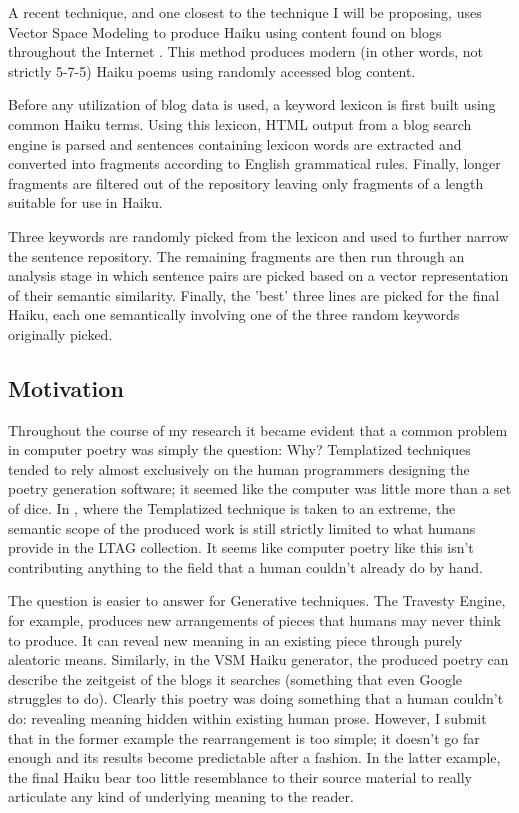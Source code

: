 \documentclass[10pt]{article}
\begin{document}
A recent technique, and one closest to the technique I will be proposing, uses
Vector Space Modeling to produce Haiku using content found on blogs throughout
the Internet \cite{Wong08}. This method produces modern (in other words, not
strictly 5-7-5) Haiku poems using randomly accessed blog content. 

Before any utilization of blog data is used, a keyword lexicon is first built
using common Haiku terms. Using this lexicon, HTML output from a blog search
engine is parsed and sentences containing lexicon words are extracted and
converted into fragments according to English grammatical rules. Finally, longer
fragments are filtered out of the repository leaving only fragments of a length
suitable for use in Haiku.

Three keywords are randomly picked from the lexicon and used to further narrow
the sentence repository. The remaining fragments are then run through an
analysis stage in which sentence pairs are picked based on a vector
representation of their semantic similarity. Finally, the 'best' three lines
are picked for the final Haiku, each one semantically involving one of the
three random keywords originally picked.

\subsection{Motivation}
Throughout the course of my research it became evident that a common problem in
computer poetry was simply the question: Why? Templatized techniques tended to
rely almost exclusively on the human programmers designing the poetry
generation software; it seemed like the computer was little more than a set of
dice. In \cite{Manurung03}, where the Templatized technique is taken to an
extreme, the semantic scope of the produced work is still strictly limited to
what humans provide in the LTAG collection. It seems like computer poetry like
this isn't contributing anything to the field that a human couldn't already do
by hand.

The question is easier to answer for Generative techniques. The Travesty
Engine, for example, produces new arrangements of pieces that humans may never
think to produce. It can reveal new meaning in an existing piece through purely
aleatoric means. Similarly, in the VSM Haiku generator, the produced poetry can
describe the zeitgeist of the blogs it searches (something that even Google
struggles to do). Clearly this poetry was doing something that a human couldn't
do: revealing meaning hidden within existing human prose. However, I submit
that in the former example the rearrangement is too simple; it doesn't go far
enough and its results become predictable after a fashion. In the latter
example, the final Haiku bear too little resemblance to their source material
to really articulate any kind of underlying meaning to the reader.
\end{document}
